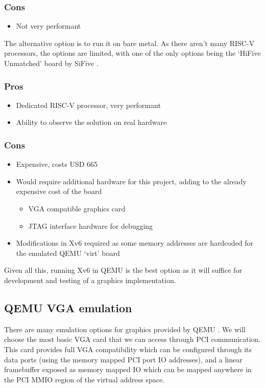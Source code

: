 \subsubsection*{Cons}
\begin{itemize}
    \item Not very performant
\end{itemize}

The alternative option is to run it on bare metal. As there aren't many 
RISC-V processors, the options are limited, with one of the only options being
the `HiFive Unmatched' board by SiFive \cite{hifiveunmatched}.

\subsubsection*{Pros}
\begin{itemize}
    \item Dedicated RISC-V processor, very performant
    \item Ability to observe the solution on real hardware
\end{itemize}
\subsubsection*{Cons}
\begin{itemize}
    \item Expensive, costs USD 665
    \item Would require additional hardware for this project, adding to the already expensive cost of the board
    \begin{itemize}
        \item VGA compatible graphics card
        \item JTAG interface hardware for debugging
    \end{itemize}
    \item Modifications in Xv6 required as some memory addresses are hardcoded for the emulated QEMU `virt' board
\end{itemize}


Given all this, running Xv6 in QEMU is the best option as it will suffice for 
development and testing of a graphics implementation.

\subsection{QEMU VGA emulation}
There are many emulation options for graphics provided by QEMU \cite{qemucards}. 
We will choose the most basic VGA card that we can access through PCI communication.
This card provides full VGA compatibility which can be configured through its data
ports (using the memory mapped PCI port IO addresses), and a linear framebuffer exposed
as memory mapped IO which can be mapped anywhere in the PCI MMIO region of the virtual
address space.


